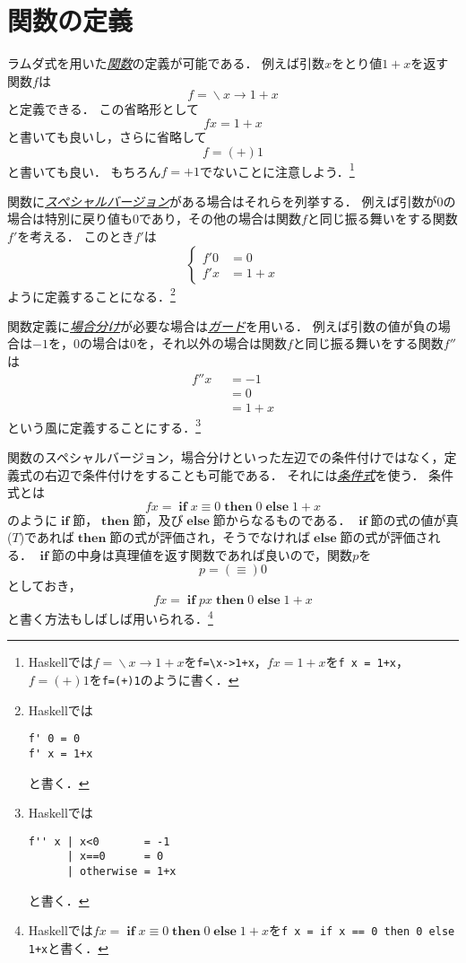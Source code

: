 \documentclass[twocolumn]{jsbook}
\newcommand{\keyword}[1]{\underline{\emph{#1}}}
\newcommand{\code}[1]{\texttt{#1}}
\newcommand{\mathKeyword}[1]{\mathbf{#1}}
\DeclareMathOperator{\mathElse}{\mathKeyword{else}}
\DeclareMathOperator{\mathIf}{\mathKeyword{if}}
\DeclareMathOperator{\mathLambda}{\backslash}
\DeclareMathOperator{\mathThen}{\mathKeyword{then}}
\newcommand{\mathLambdaArrow}{\rightarrow}
\newcommand{\mathOtherwise}{\mathKeyword{otherwise}}
\newcommand{\mathGuard}[1]{\mathop{\mid_{#1}}}
\newcommand{\mathLambdaExpression}[2]{\mathLambda#1\mathLambdaArrow#2}
\begin{document}
\section{関数の定義}

ラムダ式を用いた\keyword{関数}の定義が可能である．
例えば引数$x$をとり値$1+x$を返す関数$f$は$$f=\mathLambdaExpression{x}{1+x}$$と定義できる．
この省略形として$$fx=1+x$$と書いても良いし，さらに省略して$$f=(+)1$$と書いても良い．
もちろん$f=+1$でないことに注意しよう．\footnote{Haskellでは$f=\mathLambdaExpression{x}{1+x}$を\code{f=\textbackslash x->1+x}，$fx=1+x$を\code{f x = 1+x}，$f=(+)1$を\code{f=(+)1}のように書く．}

関数に\keyword{スペシャルバージョン}がある場合はそれらを列挙する．
例えば引数が$0$の場合は特別に戻り値も$0$であり，その他の場合は関数$f$と同じ振る舞いをする関数$f'$を考える．
このとき$f'$は
\begin{equation*}
\left\{
\begin{split}
f'0&=0\\
f'x&=1+x
\end{split}
\right.
\end{equation*}
ように定義することになる．\footnote{Haskellでは
\begin{Verbatim}[xleftmargin=10mm]
f' 0 = 0
f' x = 1+x
\end{Verbatim}
と書く．}

関数定義に\keyword{場合分け}が必要な場合は\keyword{ガード}を用いる．
例えば引数の値が負の場合は$-1$を，$0$の場合は$0$を，それ以外の場合は関数$f$と同じ振る舞いをする関数$f''$は
\begin{equation*}
\begin{split}
f''x&\mathGuard{x<0}=-1\\
&\mathGuard{x\equiv 0}=0\\
&\mathGuard{\mathOtherwise}=1+x
\end{split}
\end{equation*}
という風に定義することにする．\footnote{Haskellでは
\begin{Verbatim}[xleftmargin=10mm]
f'' x | x<0       = -1
      | x==0      = 0
      | otherwise = 1+x
\end{Verbatim}
と書く．}

関数のスペシャルバージョン，場合分けといった左辺での条件付けではなく，定義式の右辺で条件付けをすることも可能である．
それには\keyword{条件式}を使う．
条件式とは
$$fx=\mathIf x\equiv0\mathThen0\mathElse1+x$$
のように$\mathIf$節，$\mathThen$節，及び$\mathElse$節からなるものである．
$\mathIf$節の式の値が真($T$)であれば$\mathThen$節の式が評価され，そうでなければ$\mathElse$節の式が評価される．
$\mathIf$節の中身は真理値を返す関数であれば良いので，関数$p$を$$p=(\equiv)0$$としておき，$$fx=\mathIf px\mathThen0\mathElse1+x$$と書く方法もしばしば用いられる．\footnote{Haskellでは$fx=\mathIf x\equiv0\mathThen0\mathElse1+x$を\code{f x = if x == 0 then 0 else 1+x}と書く．}
\end{document}

